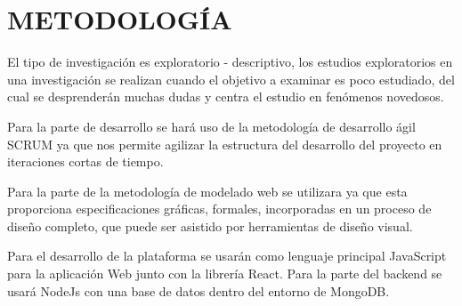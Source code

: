 \section{METODOLOGÍA}
El tipo de investigación es exploratorio - descriptivo, los estudios exploratorios en una investigación se realizan cuando el objetivo a examinar es poco estudiado, del cual se desprenderán muchas dudas y centra el estudio en fenómenos novedosos.

Para la parte de desarrollo se hará uso de la metodología de desarrollo ágil SCRUM ya que nos permite agilizar la estructura del desarrollo del proyecto en iteraciones cortas de tiempo.

Para la parte de la metodología de modelado web se utilizara ya que esta proporciona especificaciones gráficas, formales, incorporadas en un proceso de diseño completo, que puede ser asistido por herramientas de diseño visual.

Para el desarrollo de la plataforma se usarán como lenguaje principal JavaScript para la aplicación Web junto con la librería React. Para la parte del backend se usará NodeJs con una base de datos dentro del entorno de MongoDB.